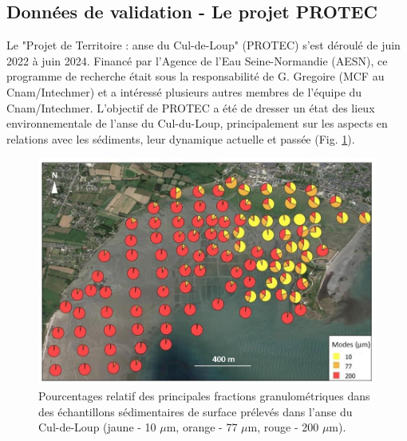 \documentclass[10pt,a4paper,titlepage]{article}
\begin{document}
\subsection{Données de validation - Le projet PROTEC}
\label{subsub:protec}

Le "Projet de Territoire : anse du Cul-de-Loup" (PROTEC) s'est déroulé de juin 2022 à juin 2024. Financé par l'Agence de l'Eau Seine-Normandie (AESN), ce programme de recherche était sous la responsabilité de G. Gregoire (MCF au Cnam/Intechmer) et a intéressé plusieurs autres membres de l'équipe du Cnam/Intechmer. L'objectif de PROTEC a été de dresser un état des lieux environnementale de l'anse du Cul-du-Loup, principalement sur les aspects en relations avec les sédiments, leur dynamique actuelle et passée (Fig. \ref{fig:sed-adcl}).

\begin{figure}[!h]
    \centering
    \includegraphics[width=0.8\linewidth]{../images/sed_adcl_protec.png}
    \caption[Sédiment de l'anse du Cul-de-Loup]{Pourcentages relatif des principales fractions granulométriques dans des échantillons sédimentaires de surface prélevés dans l'anse du Cul-de-Loup (jaune - 10 $\mu$m, orange - 77 $\mu$m, rouge - 200 $\mu$m).}
    \label{fig:sed-adcl}
\end{figure}


\end{document}

